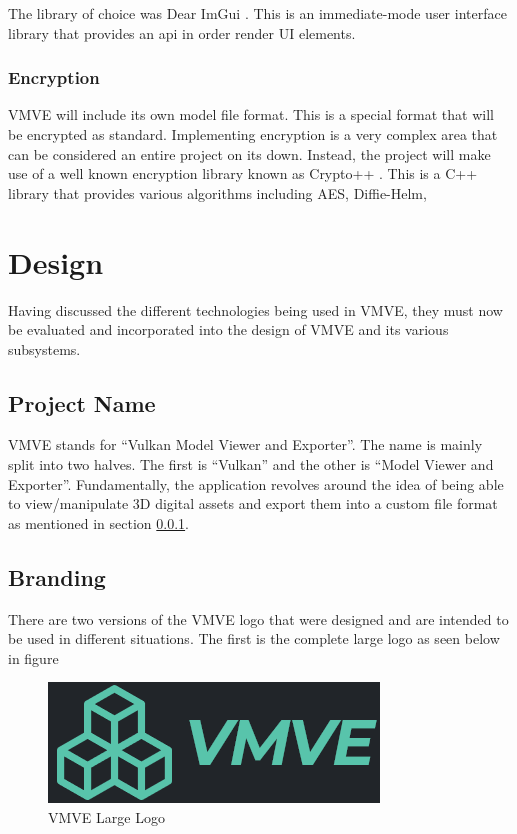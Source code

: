 \documentclass[11pt]{article}
\begin{document}
The library of choice was Dear ImGui \cite{imgui}. This is an immediate-mode
user interface library that provides an \gls{api} in order render UI elements. 

\subsubsection{Encryption} \label{custom_file_format} VMVE will include its own
model file format. This is a special format that will be encrypted as standard.
Implementing encryption is a very complex area that can be considered an entire
project on its down. Instead, the project will make use of a well known
encryption library known as Crypto++ \cite{cryptopp}. This is a C++ library that
provides various algorithms including AES, Diffie-Helm, 

\section{Design}

Having discussed the different technologies being used in VMVE, they must now be
evaluated and incorporated into the design of VMVE and its various subsystems.

\subsection{Project Name}
VMVE stands for ``Vulkan Model Viewer and Exporter''. The name is mainly split
into two halves. The first is ``Vulkan'' and the other is ``Model Viewer and
Exporter''. Fundamentally, the application revolves around the idea of being able
to view/manipulate 3D digital assets and export them into a custom file format
as mentioned in section \ref{custom_file_format}.

\subsection{Branding}

There are two versions of the VMVE logo that were designed and are intended to
be used in different situations. The first is the complete large logo as seen
below in figure {}

\begin{figure}[h!]
  \centering
  \includegraphics{images/project_logo.png}
  \caption{VMVE Large Logo}
  \label{fig:project_logo_large}
\end{figure}
\end{document}
